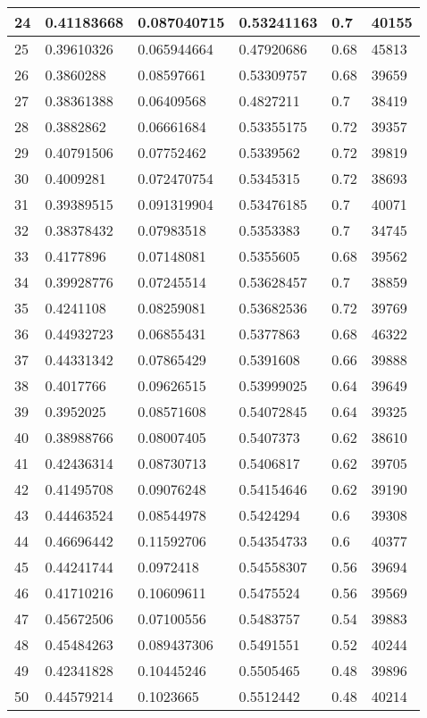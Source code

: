 \begin{longtable}{|l|l|l|l|l|l|}
24 & 0.41183668 & 0.087040715 & 0.53241163 & 0.7 & 40155 \\ \hline 
25 & 0.39610326 & 0.065944664 & 0.47920686 & 0.68 & 45813 \\ \hline 
26 & 0.3860288 & 0.08597661 & 0.53309757 & 0.68 & 39659 \\ \hline 
27 & 0.38361388 & 0.06409568 & 0.4827211 & 0.7 & 38419 \\ \hline 
28 & 0.3882862 & 0.06661684 & 0.53355175 & 0.72 & 39357 \\ \hline 
29 & 0.40791506 & 0.07752462 & 0.5339562 & 0.72 & 39819 \\ \hline 
30 & 0.4009281 & 0.072470754 & 0.5345315 & 0.72 & 38693 \\ \hline 
31 & 0.39389515 & 0.091319904 & 0.53476185 & 0.7 & 40071 \\ \hline 
32 & 0.38378432 & 0.07983518 & 0.5353383 & 0.7 & 34745 \\ \hline 
33 & 0.4177896 & 0.07148081 & 0.5355605 & 0.68 & 39562 \\ \hline 
34 & 0.39928776 & 0.07245514 & 0.53628457 & 0.7 & 38859 \\ \hline 
35 & 0.4241108 & 0.08259081 & 0.53682536 & 0.72 & 39769 \\ \hline 
36 & 0.44932723 & 0.06855431 & 0.5377863 & 0.68 & 46322 \\ \hline 
37 & 0.44331342 & 0.07865429 & 0.5391608 & 0.66 & 39888 \\ \hline 
38 & 0.4017766 & 0.09626515 & 0.53999025 & 0.64 & 39649 \\ \hline 
39 & 0.3952025 & 0.08571608 & 0.54072845 & 0.64 & 39325 \\ \hline 
40 & 0.38988766 & 0.08007405 & 0.5407373 & 0.62 & 38610 \\ \hline 
41 & 0.42436314 & 0.08730713 & 0.5406817 & 0.62 & 39705 \\ \hline 
42 & 0.41495708 & 0.09076248 & 0.54154646 & 0.62 & 39190 \\ \hline 
43 & 0.44463524 & 0.08544978 & 0.5424294 & 0.6 & 39308 \\ \hline 
44 & 0.46696442 & 0.11592706 & 0.54354733 & 0.6 & 40377 \\ \hline 
45 & 0.44241744 & 0.0972418 & 0.54558307 & 0.56 & 39694 \\ \hline 
46 & 0.41710216 & 0.10609611 & 0.5475524 & 0.56 & 39569 \\ \hline 
47 & 0.45672506 & 0.07100556 & 0.5483757 & 0.54 & 39883 \\ \hline 
48 & 0.45484263 & 0.089437306 & 0.5491551 & 0.52 & 40244 \\ \hline 
49 & 0.42341828 & 0.10445246 & 0.5505465 & 0.48 & 39896 \\ \hline 
50 & 0.44579214 & 0.1023665 & 0.5512442 & 0.48 & 40214 \\ \hline 
\end{longtable}